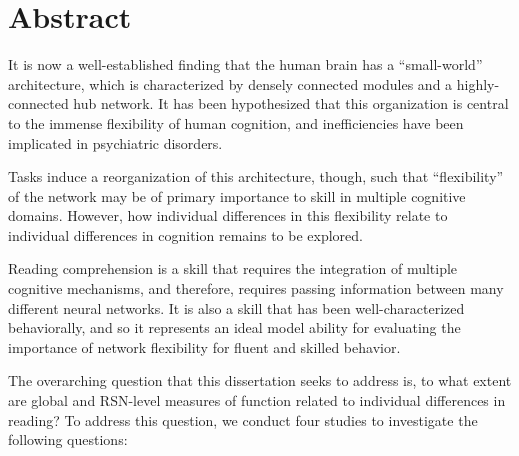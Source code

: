 \chapter{Abstract}

It is now a well-established finding that the human brain has a ``small-world'' architecture, which is characterized by densely connected modules and a highly-connected hub network. It has been hypothesized that this organization is central to the immense flexibility of human cognition, and inefficiencies have been implicated in psychiatric disorders. 

Tasks induce a reorganization of this architecture, though, such that ``flexibility'' of the network may be of primary importance to skill in multiple cognitive domains. However, how individual differences in this flexibility relate to individual differences in cognition remains to be explored.

Reading comprehension is a skill that requires the integration of multiple cognitive mechanisms, and therefore, requires passing information between many different neural networks. It is also a skill that has been well-characterized behaviorally, and so it represents an ideal model ability for evaluating the importance of network flexibility for fluent and skilled behavior.

The overarching question that this dissertation seeks to address is, to what extent are global and RSN-level measures of function related to individual differences in reading? To address this question, we conduct four studies to investigate the following questions:


